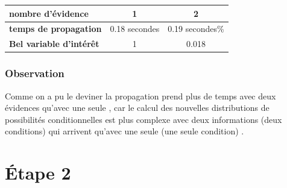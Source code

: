 \documentclass[12pt,a4paper,oneside]{book}
\begin{document}
		\begin{center}
			\begin{tabular}{ | l || c | c | }
				\hline
				\textbf{nombre d'évidence} & 1 &  2\\
				\hline
				\textbf{temps de propagation} & 0.18 secondes & 0.19 secondes\% \\
				\hline
				\textbf{Bel variable d'intérêt} & 1 & 0.018 \\
				\hline
			\end{tabular}
		\end{center}

		
	\subsubsection{Observation}
    	Comme on a pu le deviner la propagation prend plus de temps avec deux évidences qu'avec une seule , car le calcul des nouvelles distributions de possibilités conditionnelles est plus complexe avec deux informations (deux conditions) qui arrivent qu'avec une seule (une seule condition) .
	
	\newpage
	
	\section{Étape 2}
\end{document}
